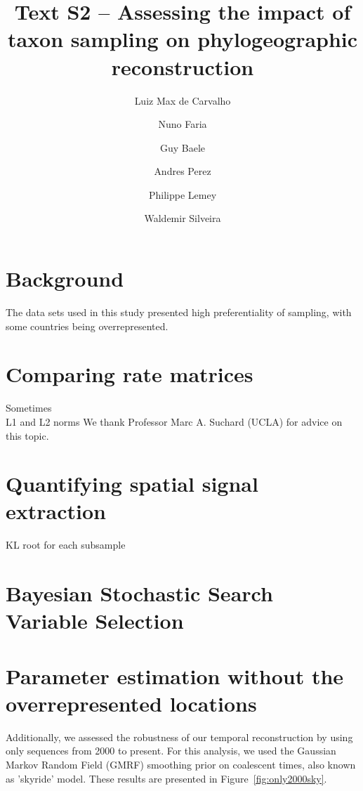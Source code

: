 \documentclass[a4paper,10pt]{article}
\title{Text S2 -- Assessing the impact of taxon sampling on phylogeographic reconstruction} %
\author{
Luiz Max de Carvalho \\
\and Nuno Faria \\
\and Guy Baele\\
\and Andres Perez \\
\and Philippe Lemey \\
\and Waldemir Silveira 
}
\date{}
\begin{document}
\maketitle

\section{Background}
The data sets used in this study presented high preferentiality of sampling, with some countries being overrepresented.
\section{Comparing rate matrices}
Sometimes \\
L1 and L2 norms
We thank Professor Marc A. Suchard (UCLA) for advice on this topic.\\
\section{Quantifying spatial signal extraction}
KL root for each subsample
\section{Bayesian Stochastic Search Variable Selection}
\section{Parameter estimation without the overrepresented locations}
Additionally, we assessed the robustness of our temporal reconstruction by using only sequences from 2000 to present.
For this analysis, we used the Gaussian Markov Random Field (GMRF) smoothing prior on coalescent times, also known as 'skyride' model.
These results are presented in Figure~\ref{fig:only2000sky}.
\end{document}

